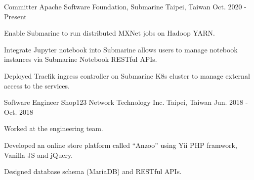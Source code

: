 \begin{cventries}
  \cventry
    {Committer} %
    {Apache Software Foundation, Submarine} %
    {Taipei, Taiwan} %
    {Oct. 2020 - Present} %
    {
      \begin{cvitems} %
        \item {Enable Submarine to run distributed MXNet jobs on Hadoop YARN.}
        \item {Integrate Jupyter notebook into Submarine allows users to manage notebook instances via Submarine Notebook RESTful APIs.}
        \item {Deployed Traefik ingress controller on Submarine K8s cluster to manage external access to the services.}
      \end{cvitems}
    }

  \cventry
    {Software Engineer} %
    {Shop123 Network Technology Inc.} %
    {Taipei, Taiwan} %
    {Jun. 2018 - Oct. 2018} %
    {
      \begin{cvitems} %
        \item {Worked at the engineering team.}
        \item {Developed an online store platform called “Anzoo” using Yii PHP framwork, Vanilla JS and jQuery.}
        \item {Designed database schema (MariaDB) and RESTful APIs.}
      \end{cvitems}
    }


\end{cventries}
